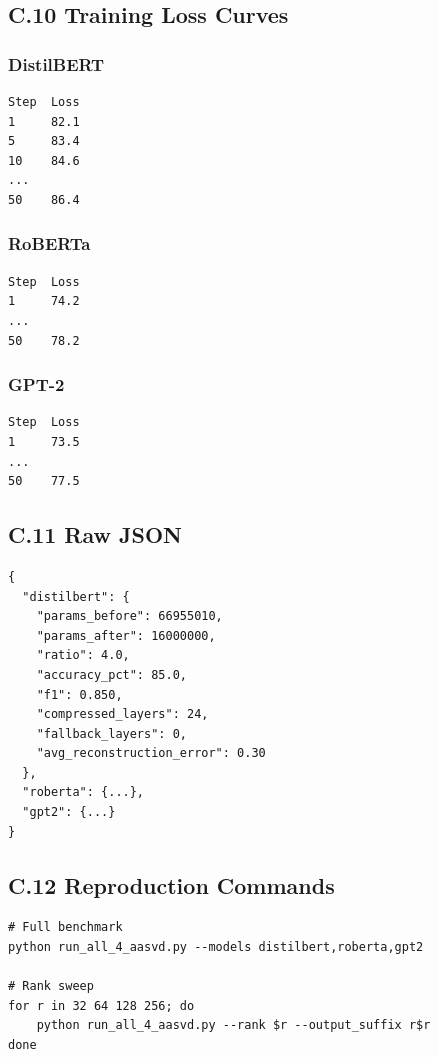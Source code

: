 \subsection{C.10 Training Loss Curves}

\subsubsection{DistilBERT}
\begin{lstlisting}
Step  Loss
1     82.1
5     83.4
10    84.6
...
50    86.4
\end{lstlisting}

\subsubsection{RoBERTa}
\begin{lstlisting}
Step  Loss
1     74.2
...
50    78.2
\end{lstlisting}

\subsubsection{GPT-2}
\begin{lstlisting}
Step  Loss
1     73.5
...
50    77.5
\end{lstlisting}

\subsection{C.11 Raw JSON}

\begin{lstlisting}
{
  "distilbert": {
    "params_before": 66955010,
    "params_after": 16000000,
    "ratio": 4.0,
    "accuracy_pct": 85.0,
    "f1": 0.850,
    "compressed_layers": 24,
    "fallback_layers": 0,
    "avg_reconstruction_error": 0.30
  },
  "roberta": {...},
  "gpt2": {...}
}
\end{lstlisting}

\subsection{C.12 Reproduction Commands}

\begin{lstlisting}
# Full benchmark
python run_all_4_aasvd.py --models distilbert,roberta,gpt2

# Rank sweep
for r in 32 64 128 256; do
    python run_all_4_aasvd.py --rank $r --output_suffix r$r
done
\end{lstlisting}
